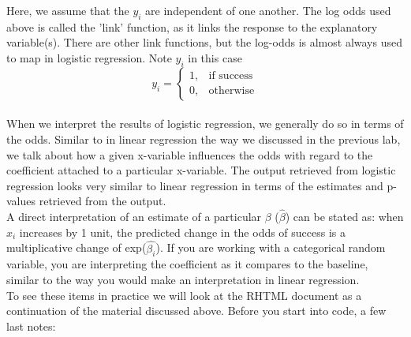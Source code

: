 \documentclass{article}
\begin{document}
Here, we assume that the $y_i$ are independent of one another.  The log odds used above is called the 'link' function, as it links the response to the explanatory variable(s).  There are other link functions, but the log-odds is almost always used to map in logistic regression.  Note $y_i$ in this case \\[.25cm]

\[
    y_i = 
\begin{cases}
    1 ,& \text{if success} \\
    0 ,& \text{otherwise}
\end{cases}
\]
\\[.25cm]
When we interpret the results of logistic regression, we generally do so in terms of the odds.  Similar to in linear regression the way we discussed in the previous lab, we talk about how a given x-variable influences the odds with regard to the coefficient attached to a particular x-variable. 
The output retrieved from logistic regression looks very similar to linear regression in terms of the estimates and p-values retrieved from the output.\\[.25cm]  

A direct interpretation of an estimate of a particular $\beta$ ($\hat{\beta}$) can be stated as: when $x_i$ increases by 1 unit, the predicted change in the odds of success is a multiplicative change of exp($\hat{\beta_i}$).  If you are working with a categorical random variable, you are interpreting the coefficient as it compares to the baseline, similar to the way you would make an interpretation in linear regression.\\[.25cm]

To see these items in practice we will look at the RHTML document as a continuation of the material discussed above.  Before you start into code, a few last notes:
\end{document}
